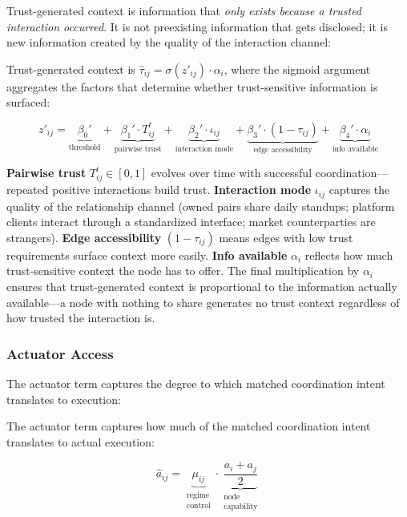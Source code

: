 \documentclass[12pt]{article}
\theoremstyle{definition}
\begin{document}
Trust-generated context is information that \textit{only exists because a trusted interaction occurred}. It is not preexisting information that gets disclosed; it is new information created by the quality of the interaction channel:

Trust-generated context is $\hat{\tau}_{ij} = \sigma(z'_{ij}) \cdot \alpha_i$, where the sigmoid argument aggregates the factors that determine whether trust-sensitive information is surfaced:

\begin{equation}
\label{eq:trust}
z'_{ij} = \underbrace{\beta_0'}_{\text{threshold}} + \underbrace{\beta_1' \cdot T_{ij}^t}_{\text{pairwise trust}} + \underbrace{\beta_2' \cdot \iota_{ij}}_{\text{interaction mode}} + \underbrace{\beta_3' \cdot (1 - \tau_{ij})}_{\text{edge accessibility}} + \underbrace{\beta_4' \cdot \alpha_i}_{\text{info available}}
\end{equation}

\noindent \textbf{Pairwise trust} $T_{ij}^t \in [0,1]$ evolves over time with successful coordination---repeated positive interactions build trust. \textbf{Interaction mode} $\iota_{ij}$ captures the quality of the relationship channel (owned pairs share daily standups; platform clients interact through a standardized interface; market counterparties are strangers). \textbf{Edge accessibility} $(1 - \tau_{ij})$ means edges with low trust requirements surface context more easily. \textbf{Info available} $\alpha_i$ reflects how much trust-sensitive context the node has to offer. The final multiplication by $\alpha_i$ ensures that trust-generated context is proportional to the information actually available---a node with nothing to share generates no trust context regardless of how trusted the interaction is.

\subsubsection{Actuator Access}
\label{sec:actuator}

The actuator term captures the degree to which matched coordination intent translates to execution:

The actuator term captures how much of the matched coordination intent translates to actual execution:

\begin{equation}
\hat{a}_{ij} = \underbrace{\mu_{ij}}_{\substack{\text{regime} \\ \text{control}}} \cdot \underbrace{\frac{a_i + a_j}{2}}_{\substack{\text{node} \\ \text{capability}}}
\end{equation}
\end{document}
